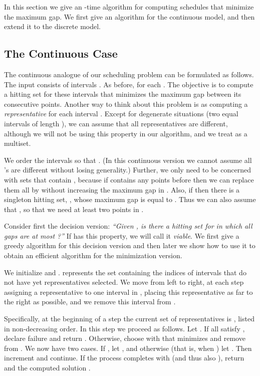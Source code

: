 In this section we give an -time algorithm for computing schedules
that minimize the maximum gap. We first give an algorithm for the
continuous model, and then extend it to the discrete model.



\subsection{The Continuous Case}

The continuous analogue of our scheduling problem can be formulated as follows. The input consists of  intervals
. As before,  for each .
The objective is to compute a hitting set  for these intervals that
minimizes the maximum gap between its consecutive points. Another way to think about this problem is as computing a
\emph{representative}  for each interval . Except for degenerate
situations (two equal intervals of length ), we can assume that
all representatives are different, although we will not be using this
property in our algorithm, and we treat  as a multiset.

We order the intervals so that . (In this continuous version
we cannot assume all 's are different without losing generality.) Further, we only need to
be concerned with sets  that contain , because if  contains any points
before  then we can replace them all by  without increasing the maximum gap in . 
Also, if  then there is a singleton hitting set, ,
whose maximum gap is equal to . Thus we can also assume
that , so that we need at least two points in .

Consider first the decision version: \emph{``Given , is there a
hitting set  for  in which all gaps are at most ?''}
If  has this property, we will call it \emph{viable}.
We first give a greedy algorithm for this decision version and
then later we show how to use it to obtain an efficient algorithm for the minimization version.



\medskip
{}
We initialize  and .  represents the set containing  the
indices of intervals that do not have yet representatives selected.
We move from left to right, at each step assigning a representative to one
interval in , placing this representative as far to the right as possible, and we remove this interval from . 

Specifically, at the beginning of a step  the current set of representatives is
, listed in non-decreasing order. In this step we proceed as follows. 
Let . If all  satisfy , declare failure and return .
Otherwise, choose  with  that minimizes  and remove  from .
We now have two cases. If , let , and otherwise
(that is, when ) let . Then increment  and continue.
If the process completes with  (and thus also ),
return  and the computed solution .



